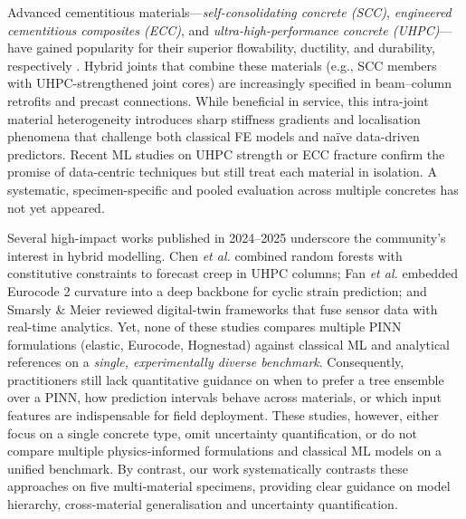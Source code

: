 \documentclass{article}
\begin{document}
Advanced cementitious materials—\emph{self-consolidating concrete (SCC)}, \emph{engineered cementitious composites (ECC)}, and \emph{ultra-high-performance concrete (UHPC)}—have gained popularity for their superior flowability, ductility, and durability, respectively \cite{Li2019ECC,Wille2019UHPC,Huang2022UHPCReview}.  Hybrid joints that combine these materials (e.g., SCC members with UHPC-strengthened joint cores) are increasingly specified in beam–column retrofits and precast connections.  While beneficial in service, this intra-joint material heterogeneity introduces sharp stiffness gradients and localisation phenomena that challenge both classical FE models and naïve data-driven predictors.  Recent ML studies on UHPC strength \cite{Das2024UHPCML} or ECC fracture \cite{Islam2021SCCECC} confirm the promise of data-centric techniques but still treat each material in isolation.  A systematic, specimen-specific and pooled evaluation across multiple concretes has not yet appeared.


Several high-impact works published in 2024–2025 underscore the community’s interest in hybrid modelling.  Chen \textit{et al.} \cite{Chen2024HybridML} combined random forests with constitutive constraints to forecast creep in UHPC columns; Fan \textit{et al.} \cite{fan2023pinn} embedded Eurocode 2 curvature into a deep backbone for cyclic strain prediction; and Smarsly \& Meier \cite{Smarsly2023DigitalTwin} reviewed digital-twin frameworks that fuse sensor data with real-time analytics.  Yet, none of these studies compares multiple PINN formulations (elastic, Eurocode, Hognestad) against classical ML and analytical references on a \emph{single, experimentally diverse benchmark}.  Consequently, practitioners still lack quantitative guidance on when to prefer a tree ensemble over a PINN, how prediction intervals behave across materials, or which input features are indispensable for field deployment.  These studies, however, either focus on a single concrete type, omit uncertainty quantification, or do not compare multiple physics‑informed formulations and classical ML models on a unified benchmark.  By contrast, our work systematically contrasts these approaches on five multi‑material specimens, providing clear guidance on model hierarchy, cross‑material generalisation and uncertainty quantification.
\end{document}
